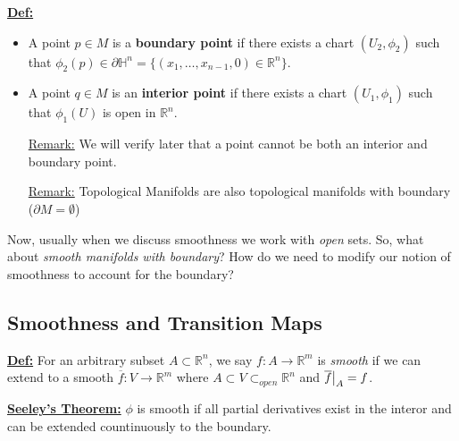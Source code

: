 \documentclass{article}
\newcommand{\R}{\mathbb{R}}
\newcommand{\restr}[2]{{%
  \left.\kern-\nulldelimiterspace %
  #1 %
  \vphantom{\big|} %
  \right|_{#2} %
  }}
\begin{document}
\vskip 0.5cm
\begin{dottedbox}
  \underline{\textbf{Def:}} 
  \begin{itemize}
    \item A point $p \in M$ is a \textbf{boundary point} if there exists a chart $(U_2, \phi_2)$ such that $\phi_2(p) \in \partial \mathbb{H}^n = \{(x_1, \dots, x_{n-1}, 0) \in \R^n \}$.
    
    \vskip 0.5cm
    \item A point $q \in M$ is an \textbf{interior point} if there exists a chart $(U_1, \phi_1)$ such that $\phi_1(U)$ is open in $\R^n$.
    
    \vskip 0.5cm
    \underline{Remark:} We will verify later that a point cannot be both an interior and boundary point.

    \vskip 0.5cm
    \underline{Remark:} Topological Manifolds are also topological manifolds with boundary ($\partial M = \emptyset$)
  \end{itemize}
\end{dottedbox}

\vskip 0.5cm
Now, usually when we discuss smoothness we work with \emph{open} sets. So, what about \emph{smooth manifolds with boundary}? How do we need to modify our notion of smoothness to account for the boundary?

\vskip 1cm
\subsection{Smoothness and Transition Maps}

\vskip 1cm
\begin{dottedbox}
  \underline{\textbf{Def:}} For an arbitrary subset $A \subset \R^n$, we say $f : A \rightarrow \R^m$ is \emph{smooth} if we can extend to a smooth $\overline{f} : V \rightarrow \R^m$ where $A \subset V \subset_{open} \R^n$ and $\restr{\overline{f}}{A} = f$.
\end{dottedbox}


\vskip 1cm
\begin{dottedbox}
  \underline{\textbf{Seeley's Theorem:}} $\phi$ is smooth if all partial derivatives exist in the interor and can be extended countinuously to the boundary.
\end{dottedbox}
\end{document}
